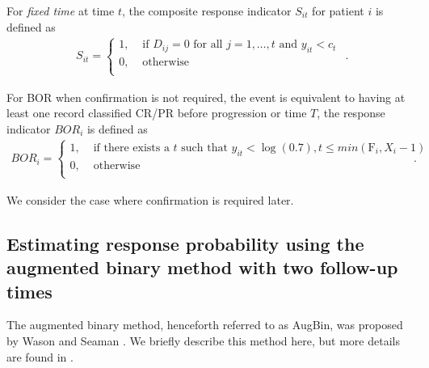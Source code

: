 \documentclass[10pt,A4]{article}
\begin{document}
For \textit{fixed time} at time $t$, the composite response indicator $S_{it}$ for patient $i$ is defined as
\[
\begin{array}{r}
S_{it}= \left\{\begin{array}{ll}
                1, & \text{ if $D_{ij}=0$ for all $j=1,\ldots,t$ and $y_{it} < c_t$} \\
                0, & \text{ otherwise}\\
                \end{array} \right.
\end{array}.
\]

For BOR when confirmation is not required, the event is equivalent to having at least one record classified CR/PR before progression or time $T$, the response indicator $BOR_i$ is defined as
\[
\begin{array}{r}
BOR_i= \left\{\begin{array}{ll}
                1, & \text{ if there exists a $t$ such that } y_{it}<\log(0.7),t\leq min(\text{F}_i,X_i-1)\\
                0, & \text{ otherwise}\\
                \end{array} \right.
\end{array}.
\]

We consider the case where confirmation is required later.

\subsection{Estimating response probability using the augmented binary method with two follow-up times} \label{Augbin}
The augmented binary method, henceforth referred to as AugBin, was proposed by Wason and Seaman \cite{Wason2013}. We briefly describe this method here, but more details are found in \cite{Wason2013}.
\end{document}
